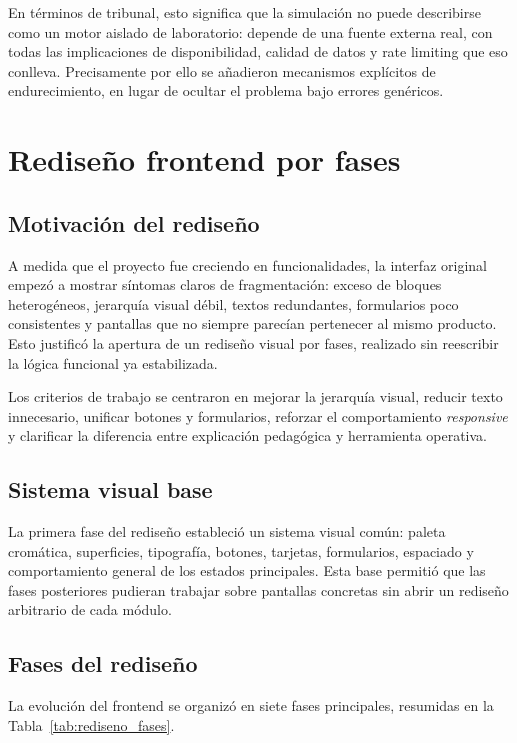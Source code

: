 En términos de tribunal, esto significa que la simulación no puede describirse como un motor aislado de laboratorio: depende de una fuente externa real, con todas las implicaciones de disponibilidad, calidad de datos y rate limiting que eso conlleva. Precisamente por ello se añadieron mecanismos explícitos de endurecimiento, en lugar de ocultar el problema bajo errores genéricos.

\section{Rediseño frontend por fases}

\subsection{Motivación del rediseño}

A medida que el proyecto fue creciendo en funcionalidades, la interfaz original empezó a mostrar síntomas claros de fragmentación: exceso de bloques heterogéneos, jerarquía visual débil, textos redundantes, formularios poco consistentes y pantallas que no siempre parecían pertenecer al mismo producto. Esto justificó la apertura de un rediseño visual por fases, realizado sin reescribir la lógica funcional ya estabilizada.

Los criterios de trabajo se centraron en mejorar la jerarquía visual, reducir texto innecesario, unificar botones y formularios, reforzar el comportamiento \textit{responsive} y clarificar la diferencia entre explicación pedagógica y herramienta operativa.

\subsection{Sistema visual base}

La primera fase del rediseño estableció un sistema visual común: paleta cromática, superficies, tipografía, botones, tarjetas, formularios, espaciado y comportamiento general de los estados principales. Esta base permitió que las fases posteriores pudieran trabajar sobre pantallas concretas sin abrir un rediseño arbitrario de cada módulo.

\subsection{Fases del rediseño}

La evolución del frontend se organizó en siete fases principales, resumidas en la Tabla~\ref{tab:rediseno_fases}.

